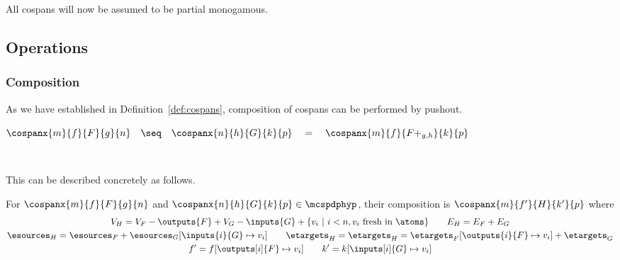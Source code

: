 \documentclass[10pt]{article}
\begin{document}
All cospans will now be assumed to be partial monogamous.

\begin{center}
    
\end{center}

\subsection{Operations}

\subsubsection{Composition}

As we have established in Definition~\ref{def:cospans}, composition of cospans can be performed by pushout.

\begin{center}
    $\cospanx{m}{f}{F}{g}{n} \quad \seq \quad \cospanx{n}{h}{G}{k}{p} \quad = \quad \cospanx{m}{f}{F +_{g,h}}{k}{p}$ 

    \vspace{1em}

     \
    \raisebox{1.3em}{$\seq$} \
     \
    \raisebox{1.3em}{$=$} \
    
\end{center}

\noindent This can be described concretely as follows.

\begin{definition}[Composition]
    For $\cospanx{m}{f}{F}{g}{n}$ and $\cospanx{n}{h}{G}{k}{p} \in \mcspdphyp$, their composition is $\cospanx{m}{f'}{H}{k'}{p}$ where 
    \begin{gather*}
        V_H = V_F - \outputs{F} + V_G - \inputs{G} + \{v_i \ |\ i < n, v_i \text{ fresh in } \atoms\} \qquad
        E_H = E_F + E_G \\
        \esources_H = \esources_F + \esources_G[\inputs{i}{G} \mapsto v_i] \qquad \etargets_H = \etargets_H = \etargets_F[\outputs{i}{F} \mapsto v_i] + \etargets_G \\
        f' = f[\outputs[i]{F} \mapsto v_i] \qquad
        k' = k[\inputs[i]{G} \mapsto v_i]
    \end{gather*}
\end{definition}
\end{document}
